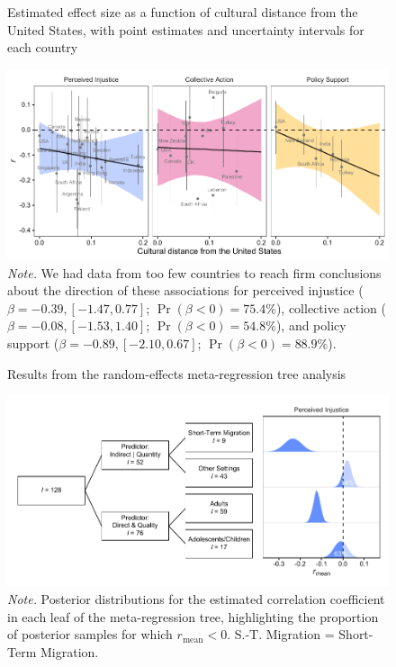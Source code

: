 \documentclass[12pt, letterpaper]{article}
\begin{document}
\begin{figure}
\centering
\caption{Estimated effect size as a function of cultural distance from the United States, with point estimates and uncertainty intervals for each country}
\includegraphics[scale=1]{../figures/figure-5}
\caption*{\textit{Note.} We had data from too few countries to reach firm conclusions about the direction of these associations for perceived injustice ($\beta = -0.39, [-1.47, 0.77]$; $\Pr (\beta < 0) = 75.4\%$), collective action ($\beta = -0.08, [-1.53, 1.40]$; $\Pr (\beta < 0) = 54.8\%$), and policy support ($\beta = -0.89, [-2.10, 0.67]$; $\Pr (\beta < 0) = 88.9\%$).}
\label{fig:f5}
\end{figure}

\begin{figure}
\centering
\caption{Results from the random-effects meta-regression tree analysis}
\includegraphics[scale=1]{../figures/figure-6}
\caption*{\textit{Note.} Posterior distributions for the estimated correlation coefficient in each leaf of the meta-regression tree, highlighting the proportion of posterior samples for which $r_\text{mean} < 0$.  S.-T. Migration = Short-Term Migration.}
\label{fig:f6}
\end{figure}
\end{document}
